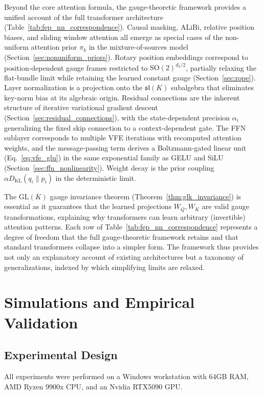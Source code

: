 \documentclass[twoside,11pt]{article}
\begin{document}
Beyond the core attention formula, the gauge-theoretic framework provides a unified account of the full transformer architecture (Table~\ref{tab:fep_nn_correspondence}). Causal masking, ALiBi, relative position biases, and sliding window attention all emerge as special cases of the non-uniform attention prior $\pi_k$ in the mixture-of-sources model (Section~\ref{sec:nonuniform_priors}). Rotary position embeddings correspond to position-dependent gauge frames restricted to $\mathrm{SO}(2)^{d_k/2}$, partially relaxing the flat-bundle limit while retaining the learned constant gauge (Section~\ref{sec:rope}). Layer normalization is a projection onto the $\mathfrak{sl}(K)$ subalgebra that eliminates key-norm bias at its algebraic origin. Residual connections are the inherent structure of iterative variational gradient descent (Section~\ref{sec:residual_connections}), with the state-dependent precision $\alpha_i$ generalizing the fixed skip connection to a context-dependent gate. The FFN sublayer corresponds to multiple VFE iterations with recomputed attention weights, and the message-passing term derives a Boltzmann-gated linear unit (Eq.~\ref{eq:vfe_glu}) in the same exponential family as GELU and SiLU (Section~\ref{sec:ffn_nonlinearity}). Weight decay is the prior coupling $\alpha D_{\mathrm{KL}}(q_i \| p_i)$ in the deterministic limit.

The $\mathrm{GL}(K)$ gauge invariance theorem (Theorem~\ref{thm:glk_invariance}) is essential as it guarantees that the learned projections $W_Q, W_K$ are valid gauge transformations, explaining why transformers can learn arbitrary (invertible) attention patterns. Each row of Table~\ref{tab:fep_nn_correspondence} represents a degree of freedom that the full gauge-theoretic framework retains and that standard transformers collapse into a simpler form. The framework thus provides not only an explanatory account of existing architectures but a taxonomy of generalizations, indexed by which simplifying limits are relaxed.


\section{Simulations and Empirical Validation}

\subsection{Experimental Design}

All experiments were performed on a Windows workstation with 64GB RAM, AMD Ryzen 9900x CPU, and an Nvidia RTX5090 GPU.
\end{document}
